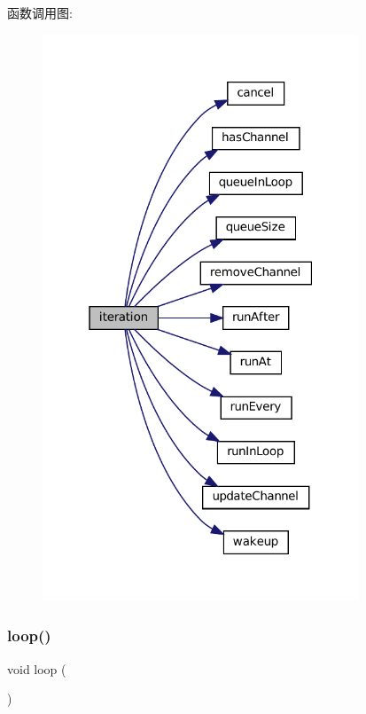 函数调用图\+:
\nopagebreak
\begin{figure}[H]
\begin{center}
\leavevmode
\includegraphics[width=268pt]{classmuduo_1_1net_1_1EventLoop_a1cee21cf429a898323eb98258939a4dc_cgraph}
\end{center}
\end{figure}
\mbox{\label{classmuduo_1_1net_1_1EventLoop_afe461d27b9c48d5921c00d521181f12f}} 
\subsubsection{\texorpdfstring{loop()}{loop()}}
{\footnotesize\ttfamily void loop (\begin{DoxyParamCaption}{ }\end{DoxyParamCaption})}

